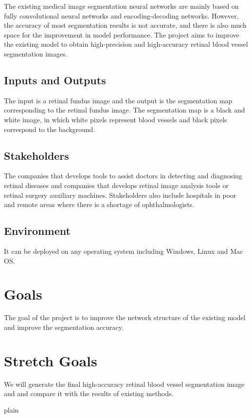 \documentclass{article}
\begin{document}
The existing medical image segmentation neural networks are mainly based on fully convolutional neural networks and encoding-decoding networks. However, the accuracy of most segmentation results is not accurate, and there is also much space for the improvement in model performance. The project aims to improve the existing model to obtain high-precision and high-accuracy retinal blood vessel segmentation images.

\subsection{Inputs and Outputs}

The input is a retinal fundus image and the output is the segmentation map corresponding to the retinal fundus image. The segmentation map is a black and white image, in which white pixels represent blood vessels and black pixels correspond to the background.

\subsection{Stakeholders}

The companies that develops tools to assist doctors in detecting and diagnosing retinal diseases and companies that develops retinal image analysis tools or retinal surgery auxiliary machines. Stakeholders also include hospitals in poor and remote areas where there is a shortage of ophthalmologists.

\subsection{Environment}

It can be deployed on any operating system including Windows, Linux and Mac OS.   

\section{Goals}
The goal of the project is to improve the network structure of the existing model and improve the segmentation accuracy.  


\section{Stretch Goals}

We will generate the final high-accuracy retinal blood vessel segmentation image and and compare it with the results of existing methods.

 {plain}

\end{document}
